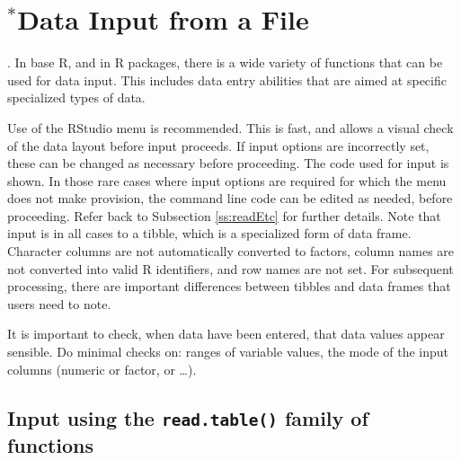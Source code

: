 






\section{$^*$Data Input from a File}\label{sec:entry}

.
In base R, and in R packages, there is a wide variety of functions that
can be used for data input.  This includes data entry abilities that are
aimed at specific specialized types of data.

Use of the RStudio menu is recommended.  This is fast, and allows
a visual check of the data layout before input proceeds.  If input
options are incorrectly set, these can be changed as necessary
before proceeding. The code used for input is shown. In those rare
cases where input options are required for which the menu does not 
make provision, the command line code can be edited as needed,
before proceeding.  Refer back to Subsection \ref{ss:readEtc} for 
further details.  Note that input is in all cases to a tibble, 
which is a specialized form of data frame. 
Character columns are not automatically converted to factors,
column names are not converted into valid R identifiers, and row
names are not set.  For subsequent processing, there are
important differences between tibbles and data frames that users
need to note.

It is important to check, when data have been entered,
that data values appear sensible.  Do minimal checks on: ranges
  of variable values, the mode of the input columns (numeric or
  factor, or \ldots). 

\subsection{Input using the \texttt{read.table()} family of functions}

